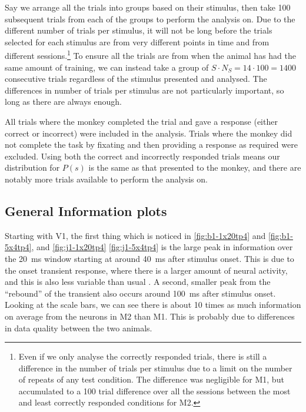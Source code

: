 Say we arrange all the trials into groups based on their stimulus, then take 100 subsequent trials from each of the groups to perform the analysis on.
Due to the different number of trials per stimulus, it will not be long before the trials selected for each stimulus are from very different points in time and from different sessions.\footnote{Even if we only analyse the correctly responded trials, there is still a difference in the number of trials per stimulus due to a limit on the number of repeats of any test condition.
The difference was negligible for \ac{M1}, but accumulated to a 100 trial difference over all the sessions between the most and least correctly responded conditions for \ac{M2}.}
To ensure all the trials are from when the animal has had the same amount of training, we can instead take a group of $S \cdot N_S = 14 \cdot 100 = 1400$ consecutive trials regardless of the stimulus presented and analysed.
The differences in number of trials per stimulus are not particularly important, so long as there are always  enough.

All trials where the monkey completed the trial and gave a response (either correct or incorrect) were included in the analysis.
Trials where the monkey did not complete the task by fixating and then providing a response as required were excluded.
Using both the correct and incorrectly responded trials means our distribution for $P(s)$ is the same as that presented to the monkey, and there are notably more trials available to perform the analysis on.



\subsection{General Information plots}

Starting with \ac{V1}, the first thing which is noticed in \autoref{fig:b1-1x20tp4} and \autoref{fig:b1-5x4tp4}, and \autoref{fig:j1-1x20tp4} \autoref{fig:j1-5x4tp4} is the large peak in information over the \SI{20}{ms} window starting at around \SI{40}{ms} after stimulus onset.
This is due to the onset transient response, where there is a larger amount of neural activity, and this is also less variable than usual \citep{Muller2001}.
A second, smaller peak from the ``rebound'' of the transient also occurs around \SI{100}{ms} after stimulus onset.
Looking at the scale bars, we can see there is about 10 times as much information on average from the neurons in \ac{M2} than \ac{M1}.
This is probably due to differences in data quality between the two animals.

